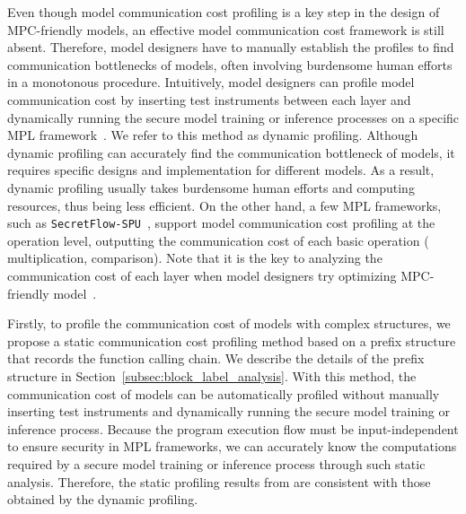 Even though model communication cost profiling is a key step in the design of MPC-friendly models, an effective model communication cost framework is still absent. Therefore, model designers have to manually establish the profiles to find communication bottlenecks of models, often involving burdensome human efforts in a monotonous procedure.
Intuitively, model designers can profile model communication cost by inserting test instruments between each layer and dynamically running the secure model training or inference processes on a specific MPL framework~\cite{ganesan2022efficient, MPCViT, li2023mpcformer, dhyani2023privit}. We refer to this method as dynamic profiling. Although dynamic profiling can accurately find the communication bottleneck of models, it requires specific designs and implementation for different models. As a result, dynamic profiling usually takes burdensome human efforts and computing resources, thus being less efficient. On the other hand, a few MPL frameworks, such as \texttt{SecretFlow-SPU}~\cite{secretflow}, support model communication cost profiling at the operation level,  outputting the communication cost of each basic operation ( multiplication, comparison).  Note that it is the key to analyzing the communication cost of each layer when model designers try optimizing MPC-friendly model~\cite{ghodsi2020cryptonas}.

 Firstly, to profile the communication cost of models with complex structures, we propose a static communication cost profiling method based on a prefix structure that records the function calling chain. We describe the details of the prefix structure in Section~\ref{subsec:block_label_analysis}. With this method, the communication cost of models can be automatically profiled without manually inserting test instruments and dynamically running the secure model training or inference process. Because the program execution flow must be input-independent to ensure security in MPL frameworks, we can accurately know the computations required by a secure model training or inference process through such static analysis. Therefore, the static profiling results from \hawkeye are consistent with those obtained by the dynamic profiling. 


